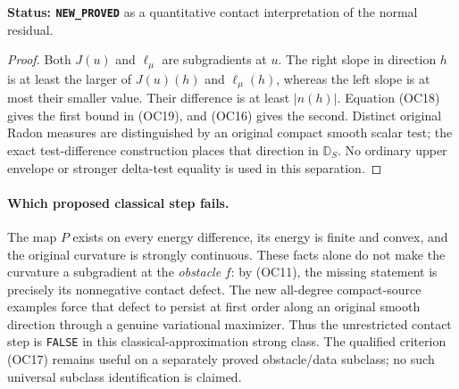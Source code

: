 \noindent\textbf{Status: \texttt{NEW\_PROVED}} as a
quantitative contact interpretation of the normal residual.

\begin{proof}
Both $J(u)$ and $\ell_\mu$ are subgradients at $u$.
The right slope in direction $h$ is at least the larger of
$J(u)(h)$ and $\ell_\mu(h)$, whereas the left slope is at
most their smaller value.  Their difference is at least
$|n(h)|$.  Equation \textup{(OC18)} gives the first bound
in \textup{(OC19)}, and \textup{(OC16)} gives the second.
Distinct original Radon measures are distinguished by an
original compact smooth scalar test; the exact test-difference
construction places that direction in $\mathbb D_S$.
No ordinary upper envelope or stronger delta-test equality
is used in this separation.
\end{proof}

\paragraph{Which proposed classical step fails.}
The map $P$ exists on every energy difference, its energy is
finite and convex, and the original curvature is strongly
continuous.  These facts alone do not make the curvature a
subgradient at the \emph{obstacle} $f$: by \textup{(OC11)},
the missing statement is precisely its nonnegative contact
defect.  The new all-degree compact-source examples force
that defect to persist at first order along an original
smooth direction through a genuine variational maximizer.
Thus the unrestricted contact step is \texttt{FALSE} in
this classical-approximation strong class.  The qualified
criterion \textup{(OC17)} remains useful on a separately
proved obstacle/data subclass; no such universal subclass
identification is claimed.
